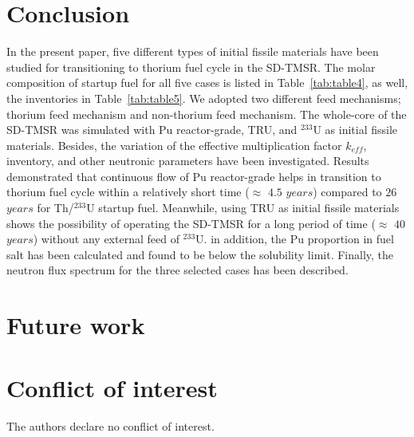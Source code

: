 \section{Conclusion}

In the present paper, five different types of initial fissile materials have been studied for transitioning to thorium fuel cycle in the \gls{SD-TMSR}. The molar composition of startup fuel for all five cases is listed in Table~\ref{tab:table4}, as well, the inventories in Table~\ref{tab:table5}. We adopted two different feed mechanisms; thorium feed mechanism and non-thorium feed mechanism. The whole-core of the SD-TMSR was simulated with Pu reactor-grade, TRU, and $^{233}$U as initial fissile materials. Besides, the variation of the effective multiplication factor $k_{eff}$, inventory, and other neutronic parameters have been investigated. Results demonstrated that continuous flow of Pu reactor-grade helps in transition to thorium fuel cycle within a relatively short time ($\approx$ $4.5$ $years$) compared to $26$ $years$ for Th/$^{233}$U startup fuel. Meanwhile, using \gls{TRU} as initial fissile materials shows the possibility of operating the SD-TMSR for a long period of time ($\approx$ $40$ $years$) without any external feed of $^{233}$U. in addition, the Pu proportion in fuel salt has been calculated and found to be below the solubility limit. Finally, the neutron flux spectrum for the three selected cases has been described.

\section{Future work}


\section{Conflict of interest}

The authors declare no conflict of interest. 
